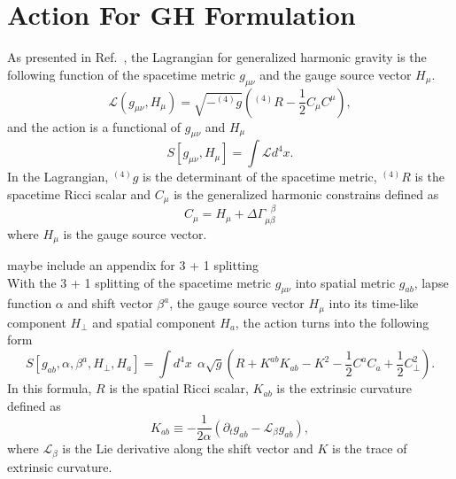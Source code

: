 \documentclass[letterpaper,nofootinbib,prd,amsmath,onecolumn]{revtex4-1}
\begin{document}
\section{Action For GH Formulation}\label{action}
As presented in Ref.~\cite{Brown:2010rya}, the Lagrangian for generalized harmonic gravity is the following function of the spacetime metric $g_{\mu\nu}$ and the gauge source vector $H_{\mu}$. 
\begin{equation}
\mathscr{L}\left( g_{\mu\nu}, H_{\mu}\right) = \sqrt{-^{(4)}g} \left(^{(4)}R - \frac{1}{2}C_{\mu}C^{\mu}\right), 
\end{equation}
and the action is a functional of $g_{\mu\nu}$ and $H_{\mu}$
\begin{equation}
S\left[g_{\mu\nu}, H_{\mu}\right] = \int \mathscr{L} d^{4}x.
\end{equation}
In the Lagrangian, $^{(4)}g$ is the determinant of the spacetime metric, $^{(4)}R$ is the spacetime Ricci scalar and $C_{\mu}$ is the generalized harmonic constrains defined as
\begin{equation}
C_{\mu} = H_{\mu} + \Delta \Gamma^{~~~\beta}_{\mu\beta}
\end{equation}
where $H_{\mu}$ is the gauge source vector. 

{\color{red} maybe include an appendix for 3 + 1 splitting }\\
With the 3 + 1 splitting of the spacetime metric $g_{\mu\nu}$ into spatial metric $g_{ab}$, lapse function $\alpha$ and shift vector $\beta^{a}$, the gauge source vector $H_{\mu}$ into its time-like component $H_{\perp}$ and spatial component $H_{a}$, the action turns into the following form
\begin{equation}\label{action}
S\left[g_{ab}, \alpha, \beta^{a}, H_{\perp}, H_{a}\right] = \int d^{4}x~~\alpha \sqrt{g} \left( R + K^{ab}K_{ab} - K^{2} - \frac{1}{2}C^{a}C_{a} + \frac{1}{2}C_{\perp}^{2}\right).
\end{equation}
In this formula, $R$ is the spatial Ricci scalar, $K_{ab}$ is the extrinsic curvature defined as
\begin{equation}
K_{ab} \equiv -\frac{1}{2\alpha}\left(\partial_{t}g_{ab} - \mathcal{L}_{\beta}g_{ab}\right),  
\end{equation}
where $\mathcal{L}_{\beta}$ is the Lie derivative along the shift vector and $K$ is the trace of extrinsic curvature. 
\end{document}
